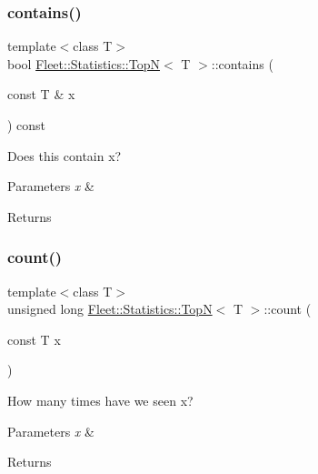 \subsubsection{\texorpdfstring{contains()}{contains()}}
{\footnotesize\ttfamily template$<$class T$>$ \\
bool \hyperlink{class_fleet_1_1_statistics_1_1_top_n}{Fleet\+::\+Statistics\+::\+TopN}$<$ T $>$\+::contains (\begin{DoxyParamCaption}\item[{const T \&}]{x }\end{DoxyParamCaption}) const\hspace{0.3cm}{\ttfamily [inline]}}



Does this contain x? 


\begin{DoxyParams}{Parameters}
{\em x} & \\
\hline
\end{DoxyParams}
\begin{DoxyReturn}{Returns}

\end{DoxyReturn}
\mbox{\label{class_fleet_1_1_statistics_1_1_top_n_a341df027d3283fe3a9bf3766521e126d}} 
\subsubsection{\texorpdfstring{count()}{count()}}
{\footnotesize\ttfamily template$<$class T$>$ \\
unsigned long \hyperlink{class_fleet_1_1_statistics_1_1_top_n}{Fleet\+::\+Statistics\+::\+TopN}$<$ T $>$\+::count (\begin{DoxyParamCaption}\item[{const T}]{x }\end{DoxyParamCaption})\hspace{0.3cm}{\ttfamily [inline]}}

How many times have we seen x? 
\begin{DoxyParams}{Parameters}
{\em x} & \\
\hline
\end{DoxyParams}
\begin{DoxyReturn}{Returns}

\end{DoxyReturn}
\mbox{\label{class_fleet_1_1_statistics_1_1_top_n_ac2b70eef6c75a0459acc88b2539dbc0b}} 
